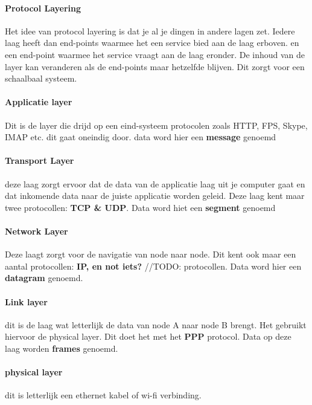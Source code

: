 \paragraph{Protocol Layering}
Het idee van protocol layering is dat je al je dingen in andere lagen zet. Iedere laag heeft dan end-points waarmee het een service bied aan de laag erboven. en een end-point waarmee het service vraagt aan de laag eronder. De inhoud van de layer kan veranderen als de end-points maar hetzelfde blijven. Dit zorgt voor een schaalbaal systeem.
\paragraph{Applicatie layer} Dit is de layer die drijd op een eind-systeem protocolen zoals HTTP, FPS, Skype, IMAP etc. dit gaat oneindig door. data word hier een \textbf{message} genoemd
\paragraph{Transport Layer} deze laag zorgt ervoor dat de data van de applicatie laag uit je computer gaat en dat inkomende data naar de juiste applicatie worden geleid. Deze laag kent maar twee protocollen: \textbf{TCP \& UDP}. Data word hiet een \textbf{segment} genoemd
\paragraph{Network Layer} Deze laagt zorgt voor de navigatie van node naar node. Dit kent ook maar een aantal protocollen: \textbf{IP, en not iets?} //TODO: protocollen. Data word hier een \textbf{datagram} genoemd.

\paragraph{Link layer} dit is de laag wat letterlijk de data van node A naar node B brengt. Het gebruikt hiervoor de physical layer. Dit doet het met het \textbf{PPP} protocol. Data op deze laag worden \textbf{frames} genoemd.

\paragraph{physical layer} dit is letterlijk een ethernet kabel of wi-fi verbinding.


